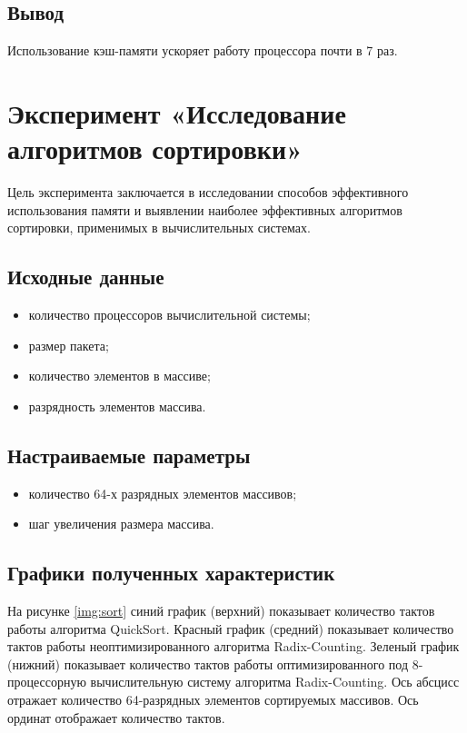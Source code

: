 \section{Вывод}

Использование кэш-памяти ускоряет работу процессора почти в 7 раз.

\chapter{Эксперимент «Исследование алгоритмов сортировки»}

Цель эксперимента заключается в исследовании способов эффективного использования памяти и выявлении наиболее эффективных алгоритмов сортировки, применимых в вычислительных
системах.

\section{Исходные данные}

\begin{itemize}
	\item количество процессоров вычислительной системы;
	\item размер пакета;
	\item количество элементов в массиве;
	\item разрядность элементов массива.
\end{itemize}

\section{Настраиваемые параметры}

\begin{itemize}
	\item количество 64-х разрядных элементов массивов;
	\item шаг увеличения размера массива.
\end{itemize}

\section{Графики полученных характеристик}

На рисунке \ref{img:sort} синий график (верхний) показывает количество тактов работы алгоритма QuickSort. Красный график (средний) показывает количество тактов работы неоптимизированного алгоритма Radix-Counting. Зеленый график (нижний) показывает количество тактов работы оптимизированного под 8-процессорную вычислительную систему алгоритма Radix-Counting. Ось абсцисс отражает количество 64-разрядных элементов сортируемых массивов. Ось ординат отображает количество тактов.

